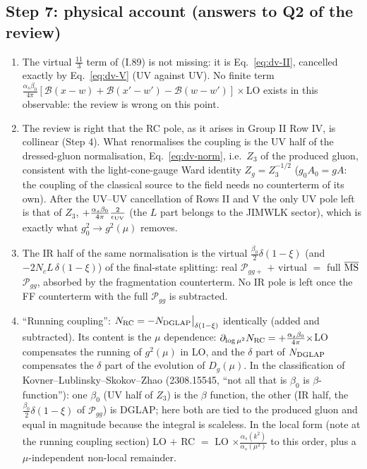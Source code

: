 \documentclass[9pt]{article}
\numberwithin{equation}{section}
\begin{document}
{\subsection*{Step 7: physical account (answers to Q2 of the review)}
\begin{enumerate}
\item The virtual $\frac{11}{3}$ term of (I.89) is not missing: it is Eq.~\eqref{eq:dv-II}, cancelled exactly by Eq.~\eqref{eq:dv-V} (UV against UV). No finite term $\frac{\alpha_{s}\beta_{0}}{4\pi}[\mathcal{B}(x-w)+\mathcal{B}(x'-w')-\mathcal{B}(w-w')]\times$LO exists in this observable: the review is wrong on this point.
\item The review is right that the RC pole, as it arises in Group II Row IV, is collinear (Step 4). What renormalises the coupling is the UV half of the dressed-gluon normalisation, Eq.~\eqref{eq:dv-norm}, i.e.\ $Z_{3}$ of the produced gluon, consistent with the light-cone-gauge Ward identity $Z_{g}=Z_{3}^{-1/2}$ ($g_{0}A_{0}=gA$: the coupling of the classical source to the field needs no counterterm of its own). After the UV--UV cancellation of Rows II and V the only UV pole left is that of $Z_{3}$, $+\frac{\alpha_{s}\beta_{0}}{4\pi}\frac{2}{\epsilon_{\rm UV}}$ (the $L$ part belongs to the JIMWLK sector), which is exactly what $g_{0}^{2}\to g^{2}(\mu)$ removes.
\item The IR half of the same normalisation is the virtual $\frac{\beta_{0}}{2}\delta(1-\xi)$ (and $-2N_{c}L\,\delta(1-\xi)$) of the final-state splitting: real $\mathcal{P}_{gg+}$ $+$ virtual $=$ full $\overline{\rm MS}$ $\mathcal{P}_{gg}$, absorbed by the fragmentation counterterm. No IR pole is left once the FF counterterm with the full $\mathcal{P}_{gg}$ is subtracted.
\item ``Running coupling'': $N_{\rm RC}=-N_{\rm DGLAP}\big|_{\delta(1-\xi)}$ identically (added and subtracted). Its content is the $\mu$ dependence: $\partial_{\log\mu^{2}}N_{\rm RC}=+\frac{\alpha_{s}\beta_{0}}{4\pi}\times$LO compensates the running of $g^{2}(\mu)$ in LO, and the $\delta$ part of $N_{\rm DGLAP}$ compensates the $\delta$ part of the evolution of $D_{g}(\mu)$. In the classification of Kovner--Lublinsky--Skokov--Zhao (2308.15545, ``not all that is $\beta_{0}$ is $\beta$-function''): one $\beta_{0}$ (UV half of $Z_{3}$) is the $\beta$ function, the other (IR half, the $\frac{\beta_{0}}{2}\delta(1-\xi)$ of $\mathcal{P}_{gg}$) is DGLAP; here both are tied to the produced gluon and equal in magnitude because the integral is scaleless. In the local form (note at the running coupling section) LO $+$ RC $=$ LO $\times\frac{\alpha_{s}(k^{2})}{\alpha_{s}(\mu^{2})}$ to this order, plus a $\mu$-independent non-local remainder.
\end{enumerate}
}\par
\end{document}
